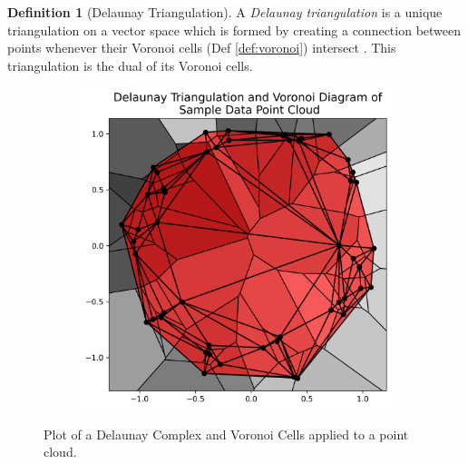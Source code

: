 \documentclass[ma]{uncgdissertationexp}
\theoremstyle{plain}
\theoremstyle{definition}
\newtheorem{definition}[theorem]{Definition}
\theoremstyle{remark}
\begin{document}
\begin{definition}[Delaunay Triangulation] A \textit{Delaunay triangulation} is a unique triangulation on a vector space which is formed by creating a connection between points whenever their Voronoi cells (Def \ref{def:voronoi}) intersect \cite{deltri}. This triangulation is the dual of its Voronoi cells.
\end{definition}
\begin{figure}[H]
    \centering
    \begin{subfigure}[b]{0.35\textwidth}
        \centering
        \includegraphics[width=\textwidth]{point_cloud_plot_del.png}
    \end{subfigure}
    \caption{Plot of a Delaunay Complex and Voronoi Cells applied to a point cloud.}
    \label{fig:point_cloud_del_voronoi}
\end{figure}
\end{document}

